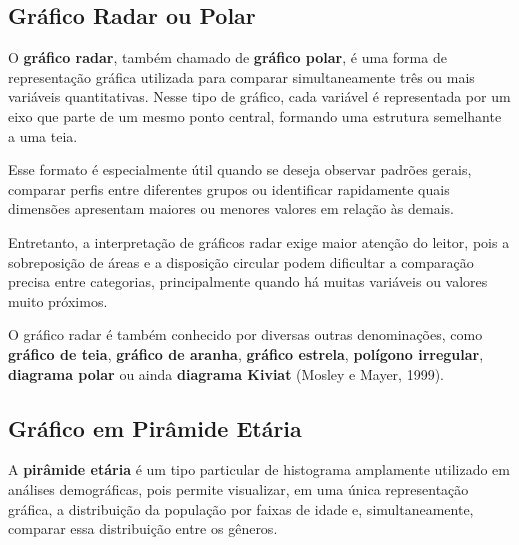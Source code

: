 \subsection{Gráfico Radar ou Polar}

O \textbf{gráfico radar}, também chamado de \textbf{gráfico polar}, é uma forma
de representação gráfica utilizada para comparar simultaneamente três ou mais
variáveis quantitativas. Nesse tipo de gráfico, cada variável é representada
por um eixo que parte de um mesmo ponto central, formando uma estrutura
semelhante a uma teia. \vskip0.3cm

Esse formato é especialmente útil quando se deseja observar padrões gerais,
comparar perfis entre diferentes grupos ou identificar rapidamente quais
dimensões apresentam maiores ou menores valores em relação às demais. \vskip0.3cm

Entretanto, a interpretação de gráficos radar exige maior atenção do leitor,
pois a sobreposição de áreas e a disposição circular podem dificultar a
comparação precisa entre categorias, principalmente quando há muitas variáveis
ou valores muito próximos. \vskip0.3cm

O gráfico radar é também conhecido por diversas outras denominações, como
\textbf{gráfico de teia}, \textbf{gráfico de aranha}, \textbf{gráfico estrela},
\textbf{polígono irregular}, \textbf{diagrama polar} ou ainda
\textbf{diagrama Kiviat} (Mosley e Mayer, 1999).


\newpage
\subsection{Gráfico em Pirâmide Etária}

A \textbf{pirâmide etária} é um tipo particular de histograma amplamente
utilizado em análises demográficas, pois permite visualizar, em uma única
representação gráfica, a distribuição da população por faixas de idade e,
simultaneamente, comparar essa distribuição entre os gêneros. \vskip0.3cm

